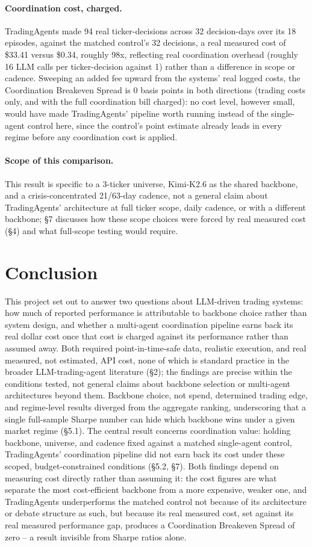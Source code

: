 \documentclass{article}
\begin{document}
\paragraph{Coordination cost, charged.} TradingAgents made 94 real ticker-decisions across 32 decision-days over its 18 episodes, against the matched control's 32 decisions, a real measured cost of \$33.41 versus \$0.34, roughly 98x, reflecting real coordination overhead (roughly 16 LLM calls per ticker-decision against 1) rather than a difference in scope or cadence. Sweeping an added fee upward from the systems' real logged costs, the Coordination Breakeven Spread is 0 basis points in both directions (trading costs only, and with the full coordination bill charged): no cost level, however small, would have made TradingAgents' pipeline worth running instead of the single-agent control here, since the control's point estimate already leads in every regime before any coordination cost is applied.
\paragraph{Scope of this comparison.} This result is specific to a 3-ticker universe, Kimi-K2.6 as the shared backbone, and a crisis-concentrated 21/63-day cadence, not a general claim about TradingAgents' architecture at full ticker scope, daily cadence, or with a different backbone; \S7 discusses how these scope choices were forced by real measured cost (\S4) and what full-scope testing would require.
\section{Conclusion}
This project set out to answer two questions about LLM-driven trading systems: how much of reported performance is attributable to backbone choice rather than system design, and whether a multi-agent coordination pipeline earns back its real dollar cost once that cost is charged against its performance rather than assumed away. Both required point-in-time-safe data, realistic execution, and real measured, not estimated, API cost, none of which is standard practice in the broader LLM-trading-agent literature (\S2); the findings are precise within the conditions tested, not general claims about backbone selection or multi-agent architectures beyond them.
Backbone choice, not spend, determined trading edge, and regime-level results diverged from the aggregate ranking, underscoring that a single full-sample Sharpe number can hide which backbone wins under a given market regime (\S5.1). The central result concerns coordination value: holding backbone, universe, and cadence fixed against a matched single-agent control, TradingAgents' coordination pipeline did not earn back its cost under these scoped, budget-constrained conditions (\S5.2, \S7).
Both findings depend on measuring cost directly rather than assuming it: the cost figures are what separate the most cost-efficient backbone from a more expensive, weaker one, and TradingAgents underperforms the matched control not because of its architecture or debate structure as such, but because its real measured cost, set against its real measured performance gap, produces a Coordination Breakeven Spread of zero -- a result invisible from Sharpe ratios alone.
\end{document}
